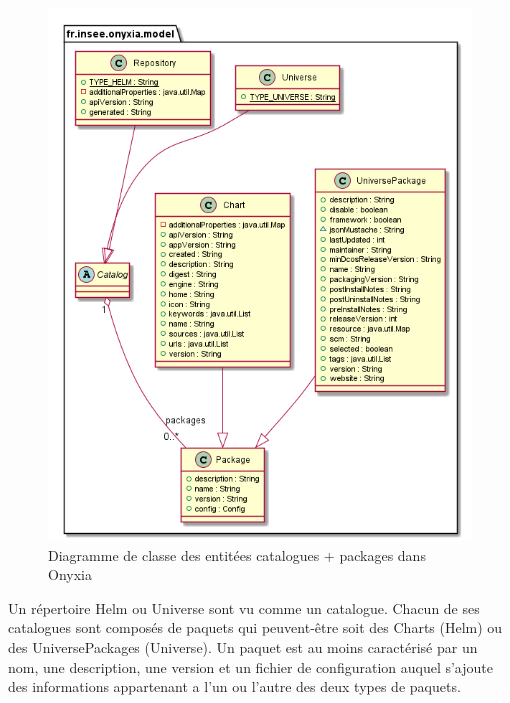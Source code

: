 \documentclass[11pt,fleqn]{book} %
\begin{document}
\begin{figure}[H]\centering
\renewcommand{\figurename}{Diagramme}
\includegraphics[scale=0.5]{Pictures/onyxia/testdiagram1.png}
\captionsetup{margin=1.5cm,format=hang,justification=justified}
\caption[]{Diagramme de classe des entitées catalogues + packages dans Onyxia \newline}
\end{figure}
\vspace{-2cm}
\begin{interrupt}
Un répertoire Helm ou Universe sont vu comme un catalogue. Chacun de ses catalogues sont composés de paquets qui peuvent-être soit des Charts (Helm) ou des UniversePackages (Universe). Un paquet est au moins caractérisé par un nom, une description, une version et un fichier de configuration auquel s'ajoute des informations appartenant a l'un ou l'autre des deux types de paquets.
\end{interrupt}
\end{document}
